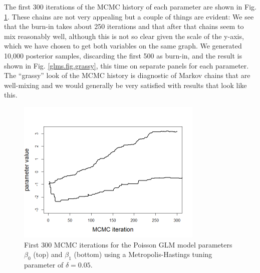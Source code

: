 The first 300 iterations of the MCMC history of each parameter
are shown in Fig. \ref{glms.fig.poissonmcmc2}. These chains are
not very appealing but a couple of things are evident: 
We see
that the burn-in takes about 250 iterations and that after that chains seem to mix 
reasonably well, although this is not so clear given the scale of the
y-axis, which we have chosen to get both variables on the same graph.
We generated 10,000 posterior samples,
discarding the first 500 as burn-in, and the result is shown in
Fig. \ref{glms.fig.grassy}, this time on separate panels for each
parameter.
The ``grassy''
look of the MCMC history is diagnostic of Markov chains that are
well-mixing and we would generally be very satisfied with results that
look like this.

\begin{figure}
\begin{center}
\includegraphics[width=3.5in]{Ch3-Bayes/figs/poissonmcmc2}
\end{center}
\caption{First 300 MCMC iterations for the Poisson GLM model
  parameters $\beta_0$ (top)
and $\beta_1$ (bottom) using
a Metropolis-Hastings tuning parameter of
 $\delta = 0.05$.}
\label{glms.fig.poissonmcmc2}
\end{figure}

